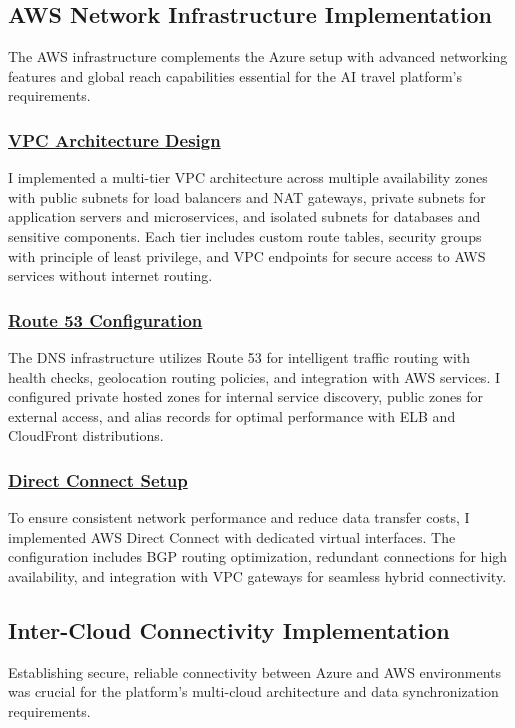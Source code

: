 \subsection{AWS Network Infrastructure Implementation}
The AWS infrastructure complements the Azure setup with advanced networking features and global reach capabilities essential for the AI travel platform's requirements.

\subsubsection*{\underline{VPC Architecture Design}}
I implemented a multi-tier VPC architecture across multiple availability zones with public subnets for load balancers and NAT gateways, private subnets for application servers and microservices, and isolated subnets for databases and sensitive components. Each tier includes custom route tables, security groups with principle of least privilege, and VPC endpoints for secure access to AWS services without internet routing.

\subsubsection*{\underline{Route 53 Configuration}}
The DNS infrastructure utilizes Route 53 for intelligent traffic routing with health checks, geolocation routing policies, and integration with AWS services. I configured private hosted zones for internal service discovery, public zones for external access, and alias records for optimal performance with ELB and CloudFront distributions.

\subsubsection*{\underline{Direct Connect Setup}}
To ensure consistent network performance and reduce data transfer costs, I implemented AWS Direct Connect with dedicated virtual interfaces. The configuration includes BGP routing optimization, redundant connections for high availability, and integration with VPC gateways for seamless hybrid connectivity.

\subsection{Inter-Cloud Connectivity Implementation}
Establishing secure, reliable connectivity between Azure and AWS environments was crucial for the platform's multi-cloud architecture and data synchronization requirements.

